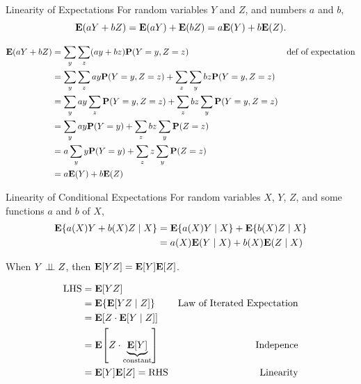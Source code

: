 \begin{thm}{Linearity of Expectations}
	For random variables $Y$ and $Z$, and numbers $a$ and $b$, \[\vb{E}(aY+bZ)=\vb{E}(aY)+\vb{E}(bZ)=a\vb{E}(Y)+b\vb{E}(Z).\]
\end{thm}
\begin{prf}
	\begin{align*}
		\vb{E}(aY+bZ)&=\sum_y\sum_z(ay+bz)\vb{P}(Y=y,Z=z)&\text{def of expectation}\\
		&=\sum_y\sum_zay\vb{P}(Y=y,Z=z)+\sum_z\sum_ybz\vb{P}(Y=y,Z=z)\\
		&=\sum_yay\sum_z\vb{P}(Y=y,Z=z)+\sum_zbz\sum_y\vb{P}(Y=y,Z=z)\\
		&=\sum_yay\vb{P}(Y=y)+\sum_zbz\sum_y\vb{P}(Z=z)\\
		&=a\sum_yy\vb{P}(Y=y)+\sum_zz\sum_y\vb{P}(Z=z)\\
		&=a\vb{E}(Y)+b\vb{E}(Z)
	\end{align*}
\end{prf}
\begin{thm}{Linearity of Conditional Expectations}
	For random variables $X$, $Y$, $Z$, and some functions $a$ and $b$ of $X$, \begin{align*}\vb{E}\qty{a(X)Y+b(X)Z\mid X}&=\vb{E}\qty{a(X)Y\mid X}+\vb{E}\qty{b(X)Z\mid X}\\&=a(X)\vb{E}(Y\mid X)+b(X)\vb{E}(Z\mid X)\end{align*}
\end{thm}
\begin{cor}{}
	When $Y\perp\!\!\!\perp Z$, then $\vb{E}\qty[YZ]=\vb{E}[Y]\vb{E}[Z]$.
\end{cor}
\begin{prf}
	\begin{align*}
		\text{LHS}&=\vb{E}[YZ]\\
		&=\vb{E}\qty{\vb{E}[YZ\mid Z]}&\text{Law of Iterated Expectation}\\
		&=\vb{E}\qty[Z\cdot\vb{E}\qty[Y\mid Z]]\\
		&=\vb{E}\qty[Z\cdot\underbrace{\vb{E}[Y]}_\text{constant}]&\text{Indepence}\\
		&=\vb{E}[Y]\vb{E}[Z]=\text{RHS}&\text{Linearity}
	\end{align*}	
\end{prf}

